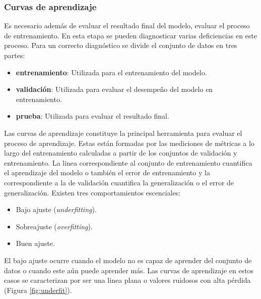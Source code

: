 \subsubsection{Curvas de aprendizaje}

Es necesario además de evaluar el resultado final del modelo, evaluar el proceso de entrenamiento. En esta etapa 
se pueden diagnosticar varias deficiencias en este proceso. Para un correcto diagnóstico se divide el conjunto de 
datos en tres partes:

\begin{itemize}
	\item \textbf{entrenamiento}: Utilizada para el entrenamiento del modelo.
	\item \textbf{validación}: Utilizada para evaluar el desempeño del modelo en entrenamiento.
	\item \textbf{prueba}: Utilizada para evaluar el resultado final.
\end{itemize}

Las curvas de aprendizaje constituye la principal herramienta para evaluar el proceso de aprendizaje.
Estas están formadas por las mediciones de métricas a lo largo del entrenamiento calculadas a partir de 
los conjuntos de validación y entrenamiento. La linea correspondiente al conjunto de entrenamiento cuantifica 
el aprendizaje del modelo o también el error de entrenamiento y la correspondiente a la de validación cuantifica 
la generalización o el error de generalización. Existen tres comportamientos escenciales:

\begin{itemize}
	\item Bajo ajuste (\emph{underfitting}).
	\item Sobreajuste (\emph{overfitting}).
	\item Buen ajuste.
\end{itemize}

El bajo ajuste ocurre cuando el modelo no es capaz de aprender del conjunto de datos o cuando este aún puede aprender 
más. Las curvas de aprendizaje en estos casos se caracterizan por ser una linea plana o valores ruidosos con alta pérdida
(Figura \ref{fig:underfit}).

